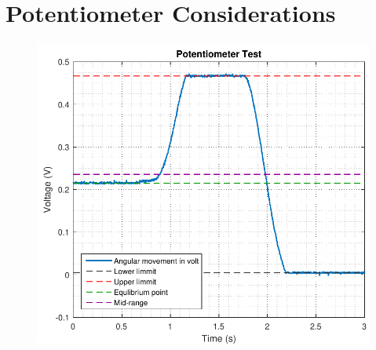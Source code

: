 \pagebreak
\section{Potentiometer Considerations}

\begin{minipage}{\linewidth}
  	\begin{minipage}{0.45\linewidth}
  		\begin{figure}[H]
  			\includegraphics[scale=.5]{figures/PotentiometerResolution}
  			\centering
  			\captionsetup{justification=centering}
  			\label{PotentiometerResolution}
  		\end{figure}\vspace{-5mm}
  	\end{minipage}
  	\hspace{0.03\linewidth}
  	\begin{minipage}{0.45\linewidth}
  		\begin{figure}[H]
  		\vspace{.5cm}

\end{figure}
\end{minipage}
\end{minipage}
